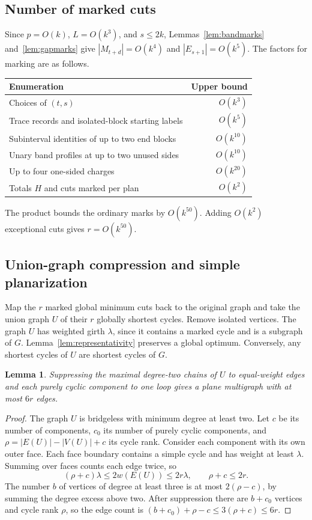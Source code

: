 \documentclass[10pt,letterpaper]{article}
\newtheorem{lemma}{Lemma}
\begin{document}
\subsection{Number of marked cuts}
Since \(p=O(k)\), \(L=O(k^3)\), and \(s\le2k\), Lemmas~\ref{lem:bandmarks} and~\ref{lem:gapmarks} give \(|M_{t+d}|=O(k^4)\) and \(|E_{s+1}|=O(k^5)\). The factors for marking are as follows.
\begin{center}
\begin{tabular}{@{}lr@{}}
\toprule
Enumeration & Upper bound\\
\midrule
Choices of \((t,s)\) & \(O(k^3)\)\\
Trace records and isolated-block starting labels & \(O(k^5)\)\\
Subinterval identities of up to two end blocks & \(O(k^{10})\)\\
Unary band profiles at up to two unused sides & \(O(k^{10})\)\\
Up to four one-sided charges & \(O(k^{20})\)\\
Totals \(H\) and cuts marked per plan & \(O(k^2)\)\\
\bottomrule
\end{tabular}
\end{center}
The product bounds the ordinary marks by \(O(k^{50})\). Adding \(O(k^2)\) exceptional cuts gives \(r=O(k^{50})\).

\subsection{Union-graph compression and simple planarization}
Map the \(r\) marked global minimum cuts back to the original graph and take the union graph \(U\) of their \(r\) globally shortest cycles. Remove isolated vertices. The graph \(U\) has weighted girth \(\lambda\), since it contains a marked cycle and is a subgraph of \(G\). Lemma~\ref{lem:representativity} preserves a global optimum. Conversely, any shortest cycles of \(U\) are shortest cycles of \(G\).

\begin{lemma}\label{lem:unionsize}
Suppressing the maximal degree-two chains of \(U\) to equal-weight edges and each purely cyclic component to one loop gives a plane multigraph with at most \(6r\) edges.
\end{lemma}
\begin{proof}
The graph \(U\) is bridgeless with minimum degree at least two. Let \(c\) be its number of components, \(c_0\) its number of purely cyclic components, and \(\rho=|E(U)|-|V(U)|+c\) its cycle rank. Consider each component with its own outer face. Each face boundary contains a simple cycle and has weight at least \(\lambda\). Summing over faces counts each edge twice, so
\[
     (\rho+c)\lambda\le2w(E(U))\le2r\lambda,\qquad \rho+c\le2r.
\]
The number \(b\) of vertices of degree at least three is at most \(2(\rho-c)\), by summing the degree excess above two. After suppression there are \(b+c_0\) vertices and cycle rank \(\rho\), so the edge count is \((b+c_0)+\rho-c\le3(\rho+c)\le6r\).
\end{proof}
\end{document}
